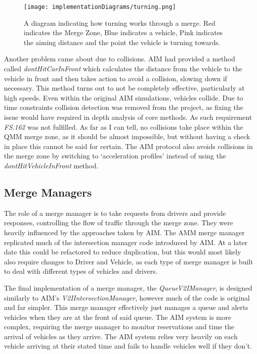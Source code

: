 \begin{figure}[htb]
\texttt{[image: implementationDiagrams/turning.png]}
\caption{A diagram indicating how turning works through a merge. Red indicates the Merge Zone, Blue indicates a vehicle, Pink indicates the aiming distance and the point the vehicle is turning towards.}
\label{fig:turning}
\end{figure}

Another problem came about due to collisions. AIM had provided a method called \emph{dontHitCarInFront} which calculates the distance from the vehicle to the vehicle in front and then takes action to avoid a collision, slowing down if necessary. This method turns out to not be completely effective, particularly at high speeds. Even within the original AIM simulations, vehicles collide. Due to time constraints collision detection was removed from the project, as fixing the issue would have required in depth analysis of core methods. As such requirement \emph{FS.162} was not fulfilled. As far as I can tell, no collisions take place within the QMM merge zone, as it should be almost impossible, but without having a check in place this cannot be said for certain. The AIM protocol also avoids collisions in the merge zone by switching to `acceleration profiles' instead of using the \emph{dontHitVehicleInFront} method.

\subsection{Merge Managers}
\label{subsec:Merge Managers}
The role of a merge manager is to take requests from drivers and provide responses, controlling the flow of traffic through the merge zone. They were heavily influenced by the approaches taken by AIM. The AMM merge manager replicated much of the intersection manager code introduced by AIM. At a later date this could be refactored to reduce duplication, but this would most likely also require changes to Driver and Vehicle, as each type of merge manager is built to deal with different types of vehicles and drivers.

The final implementation of a merge manager, the \emph{QueueV2IManager}, is designed similarly to AIM's \emph{V2IIntersectionManager}, however much of the code is original and far simpler. This merge manager effectively just manages a queue and alerts vehicles when they are at the front of said queue. The AIM system is more complex, requiring the merge manager to monitor reservations and time the arrival of vehicles as they arrive. The AIM system relies very heavily on each vehicle arriving at their stated time and fails to handle vehicles well if they don't.

